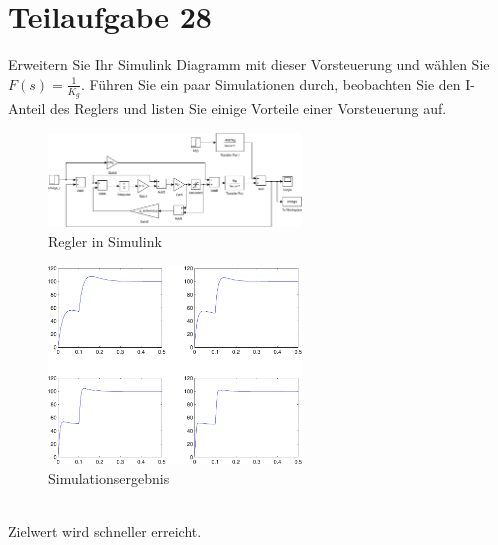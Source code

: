 \section{Teilaufgabe 28}
\begin{aufgabe}
    Erweitern Sie Ihr Simulink Diagramm mit dieser Vorsteuerung und wählen Sie 
    $F(s) = \frac{1}{K_g}$. Führen Sie ein paar Simulationen durch, beobachten 
    Sie den I-Anteil des Reglers und listen Sie einige Vorteile einer 
    Vorsteuerung auf.
\end{aufgabe}
\begin{figure}[h!]
    \centering
    \includegraphics[width=0.6\textwidth]{28/regler_feedforward.pdf}
    \caption{Regler in Simulink}
    \label{fig:28}
\end{figure}
\begin{figure}[h!]
    \centering
    \includegraphics[width=0.6\textwidth]{28/regler_feedforward_plot.pdf}
    \caption{Simulationsergebnis}
    \label{fig:28plot}
\end{figure}
\\
Zielwert wird schneller erreicht. 
